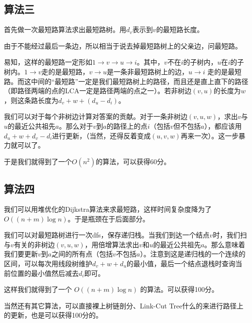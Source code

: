 \documentclass[11pt, a4paper]{article}
\begin{document}
\subsection*{算法三}
首先做一次最短路算法求出最短路树。用$d_v$表示到$v$的最短路长度。

由于不能经过最后一条边，所以相当于说去掉最短路树上的父亲边，问最短路。

易知，这样的最短路一定形如$1 \rightarrow v \rightarrow u \rightarrow i$。其中，$v$不在$i$的子树内，$u$在$i$的子树内。$1 \rightarrow v$走的是最短路，$v \rightarrow u$是一条非最短路树上的边，$u \rightarrow i$ 走的是最短路。而这中间的“最短路”一定是我们最短路树上的路径，而且还是直上直下的路径（即路径两端的点的LCA一定是路径两端的点之一）。若非树边$(v, u)$的长度为$w$，则这条路长度为$d_v + w + (d_u - d_i)$。

我们可以对于每个非树边计算对答案的贡献。对于一条非树边$(v, u, w)$，求出$v$与$u$的最近公共祖先$a$。那么对于$v$到$a$的路径上的点$i$（包括$v$但不包括$a$），都应该用$d_u + w + d_v - d_i$进行更新，（当然，还得反着变成$(u, v, w)$再来一次）。这一步暴力就可以了。

于是我们就得到了一个$O(n^2)$的算法，可以获得60分。


\subsection*{算法四}
我们可以用堆优化的Dijkstra算法来求最短路，这样时间复杂度降为了$O((n + m) \log{n})$。于是瓶颈在于后面部分。

我们可以对最短路树进行一次dfs，保存递归栈。当我们到达一个结点$v$时，我们扫与$v$有关的非树边$(v, u, w)$，用倍增算法求出$v$和$u$的最近公共祖先$a$。那么意味着我们要更新$v$到$a$之间的所有点（包括$v$不包括$a$）。注意到这是递归栈的一个连续的区间，可以每次用线段树维护$d_v + w + d_u$的最小值，最后一个结点退栈时查询当前位置的最小值然后减去$d_i$即可。

这样我们就得到了一个 $O((n + m) \log n)$ 的算法。可以获得100分。

当然还有其它算法，可以直接裸上树链剖分、Link-Cut Tree什么的来进行路径上的更新，也是可以获得100分的。
\end{document}
